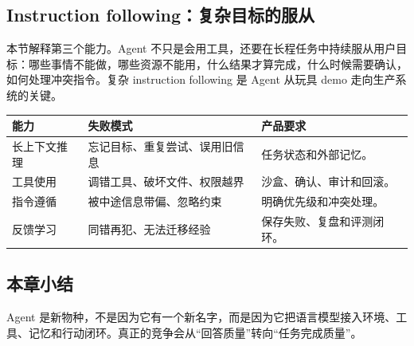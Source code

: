 \subsection{Instruction following：复杂目标的服从}

本节解释第三个能力。Agent 不只是会用工具，还要在长程任务中持续服从用户目标：哪些事情不能做，哪些资源不能用，什么结果才算完成，什么时候需要确认，如何处理冲突指令。复杂 instruction following 是 Agent 从玩具 demo 走向生产系统的关键。

\noindent\begin{tabularx}{\textwidth}{p{}p{}X}
\toprule
能力 & 失败模式 & 产品要求 \\
\midrule
长上下文推理 & 忘记目标、重复尝试、误用旧信息 & 任务状态和外部记忆。 \\
工具使用 & 调错工具、破坏文件、权限越界 & 沙盒、确认、审计和回滚。 \\
指令遵循 & 被中途信息带偏、忽略约束 & 明确优先级和冲突处理。 \\
反馈学习 & 同错再犯、无法迁移经验 & 保存失败、复盘和评测闭环。 \\
\bottomrule
\end{tabularx}

\subsection{本章小结}

Agent 是新物种，不是因为它有一个新名字，而是因为它把语言模型接入环境、工具、记忆和行动闭环。真正的竞争会从“回答质量”转向“任务完成质量”。

